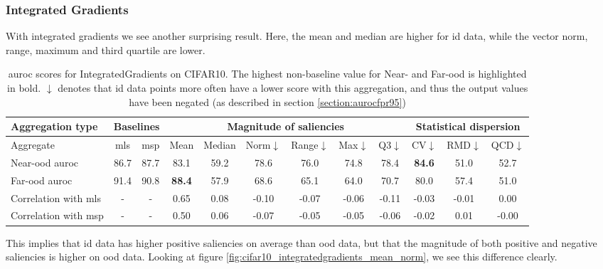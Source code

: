 \documentclass[UKenglish]{uiomasterthesis} %
\theoremstyle{definition}
\begin{document}
\subsubsection{Integrated Gradients}

With integrated gradients we see another surprising result. Here, the mean and median are higher for \ac{id} data, while the vector norm, range, maximum and third quartile are lower.

\begin{table}[hbtp]
\setlength\tabcolsep{3pt}
\begin{center}
\begin{tabular}{ |p{5.1em}|c c|c c c c c c|c c c| }
    \hline
     \centering Aggregation type & \multicolumn{2}{c|}{Baselines} & \multicolumn{6}{c|}{Magnitude of saliencies} & \multicolumn{3}{p{8em}|}{\centering Statistical dispersion} \\
    \hline
    Aggregate & \ac{mls} & \ac{msp} & Mean & Median & Norm$\downarrow$ & Range$\downarrow$ & Max$\downarrow$ & Q3$\downarrow$ & CV$\downarrow$ & RMD$\downarrow$ & QCD$\downarrow$  \\
    \hline
    \rowcolor{near!50}
    Near-\ac{ood} \ac{auroc} & 86.7 & 87.7 & 83.1 & 59.2 & 78.6 & 76.0 & 74.8 & 78.4 &\textbf{ 84.6 }& 51.0 & 52.7  \\
    \hline
    \rowcolor{far!50}
    Far-\ac{ood} \ac{auroc} & 91.4 & 90.8 &\textbf{ 88.4 }& 57.9 & 68.6 & 65.1 & 64.0 & 70.7 & 80.0 & 57.4 & 51.0  \\
    \hline
    Correlation with \ac{mls}& - & - & 0.65 & 0.08 & -0.10 & -0.07 & -0.06 & -0.11 & -0.03 & -0.01 & 0.00  \\
    \hline
    Correlation with \ac{msp}& - & - & 0.50 & 0.06 & -0.07 & -0.05 & -0.05 & -0.06 & -0.02 & 0.01 & -0.00  \\
    \hline
    \end{tabular}
    \caption[\ac{auroc} scores for IntegratedGradients on CIFAR10]{\ac{auroc} scores for IntegratedGradients on CIFAR10. The highest non-baseline value for Near- and Far-\ac{ood} is highlighted in bold. $\downarrow$ denotes that \ac{id} data points more often have a lower score with this aggregation, and thus the output values have been negated (as described in section \ref{section:aurocfpr95})}
    \label{table:cifar10_integratedgradients_metrics}
\end{center}
\setlength\tabcolsep{6pt}
\end{table}

This implies that \ac{id} data has higher positive saliencies on average than \ac{ood} data, but that the magnitude of both positive and negative saliencies is higher on \ac{ood} data. Looking at figure \ref{fig:cifar10_integratedgradients_mean_norm}, we see this difference clearly.
\end{document}

